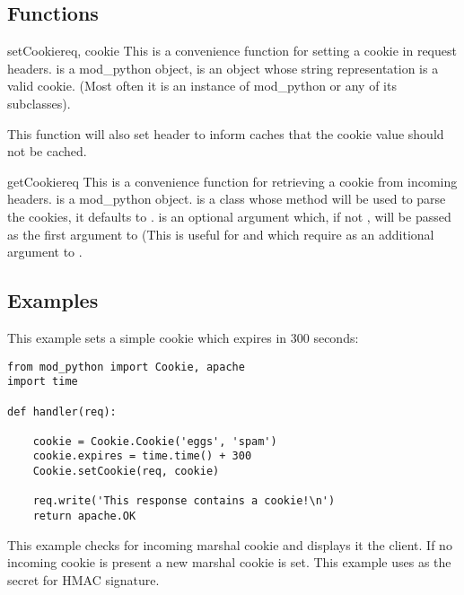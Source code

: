 \subsection{Functions\label{pyapi-cookie-func}}

\begin{funcdesc}{setCookie}{req, cookie}
  This is a convenience function for setting a cookie in request
  headers.  is a mod_python  object,
   is an object whose string representation is a valid
  cookie. (Most often it is an instance of mod_python 
  or any of its subclasses).

  This function will also set  header to inform caches that the cookie value
  should not be cached.
\end{funcdesc}

\begin{funcdesc}{getCookie}{req }
  This is a convenience function for retrieving a cookie from incoming
  headers.  is a mod_python 
  object.  is a class whose  method will be
  used to parse the cookies, it defaults to . 
  is an optional argument which, if not , will be passed as
  the first argument to  (This is useful for
   and  which require
   as an additional argument to .
\end{funcdesc}

\subsection{Examples\label{pyapi-cookie-example}}

This example sets a simple cookie which expires in 300 seconds:

\begin{verbatim}
from mod_python import Cookie, apache
import time

def handler(req):

    cookie = Cookie.Cookie('eggs', 'spam')
    cookie.expires = time.time() + 300
    Cookie.setCookie(req, cookie)

    req.write('This response contains a cookie!\n')
    return apache.OK

\end{verbatim}

This example checks for incoming marshal cookie and displays it the
client. If no incoming cookie is present a new marshal cookie is set.
This example uses  as the secret for HMAC signature.

